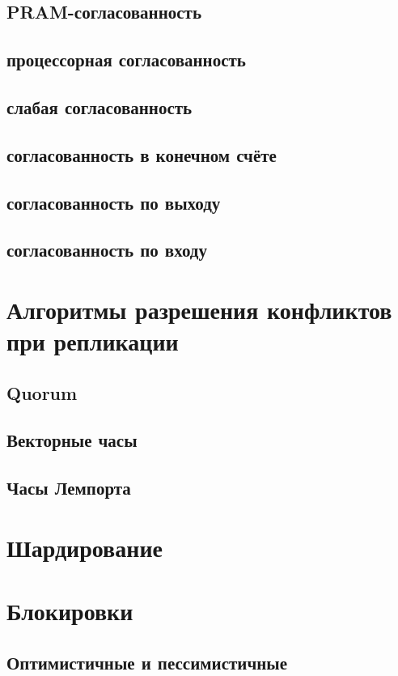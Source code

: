 \subsection{PRAM-согласованность}
\subsection{процессорная согласованность}
\subsection{слабая согласованность }
\subsection{согласованность в конечном счёте}
\subsection{согласованность по выходу}
\subsection{согласованность по входу}

\section{Алгоритмы разрешения конфликтов при репликации}
\subsection{Quorum}
\subsection{Векторные часы}
\subsection{Часы Лемпорта}

\section{Шардирование}
\section{Блокировки}

\subsection{Оптимистичные и пессимистичные}
